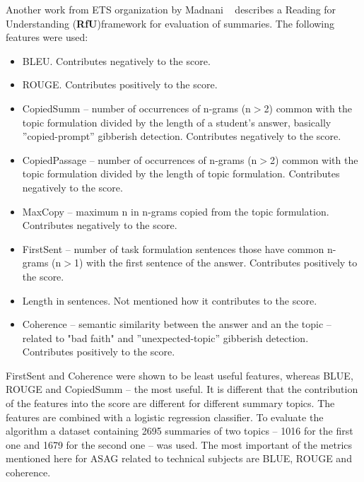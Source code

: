 Another work from ETS organization by Madnani ~\cite{Madnani} describes a Reading for Understanding (\textbf{RfU})framework  for evaluation of summaries. The following features were used: 
\begin{itemize}
\item BLEU. Contributes negatively to the score.
\item ROUGE. Contributes positively to the score.
\item CopiedSumm -- number of occurrences of n-grams (n$>$2) common with the topic formulation divided by the length of a student's answer, basically ”copied-prompt” gibberish detection. Contributes negatively to the score.
\item CopiedPassage -- number of occurrences of n-grams (n$>$2) common with the topic formulation divided by the length of topic formulation. Contributes negatively to the score.
\item MaxCopy -- maximum n in n-grams copied from the topic formulation. Contributes negatively to the score.
\item FirstSent -- number of task formulation sentences those have common n-grams (n$>$1) with the first sentence of the answer. Contributes positively to the score.
\item Length in sentences. Not mentioned how it contributes to the score.
\item Coherence -- semantic similarity between the answer and an the topic -- related to "bad faith" and ”unexpected-topic” gibberish detection. Contributes positively to the score.
\end{itemize}

FirstSent and Coherence were shown to be least useful features, whereas BLUE, ROUGE and CopiedSumm -- the most useful. It is different that the contribution of the features into the score are different for different summary topics. The features are combined with a logistic regression classifier. To evaluate the algorithm a dataset containing 2695 summaries of two topics -- 1016 for the first one and 1679 for the second one -- was used. The most important of the metrics mentioned here for ASAG related to technical subjects are BLUE, ROUGE and coherence.\\

